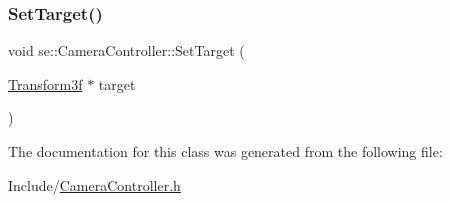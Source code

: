 \mbox{\label{classse_1_1_camera_controller_a7b9d137e927ce64aae6af3f21c64f1d5}} 
\subsubsection{\texorpdfstring{Set\+Target()}{SetTarget()}}
{\footnotesize\ttfamily void se\+::\+Camera\+Controller\+::\+Set\+Target (\begin{DoxyParamCaption}\item[{\mbox{\hyperlink{classse_1_1_transform3f}{Transform3f}} $\ast$}]{target }\end{DoxyParamCaption})}



The documentation for this class was generated from the following file\+:\begin{DoxyCompactItemize}
\item 
Include/\mbox{\hyperlink{_camera_controller_8h}{Camera\+Controller.\+h}}\end{DoxyCompactItemize}
